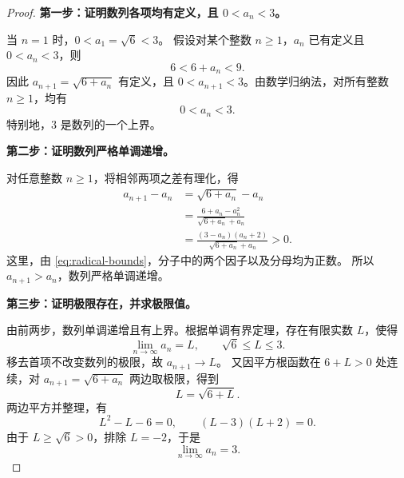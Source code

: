 \documentclass[UTF8,12pt,a4paper,fontset=fandol]{ctexart}
\begin{document}
\begin{proof}
\textbf{第一步：证明数列各项均有定义，且 $0<a_n<3$。}

当 $n=1$ 时，$0<a_1=\sqrt{6}<3$。
假设对某个整数 $n\ge1$，$a_n$ 已有定义且 $0<a_n<3$，则
\[
  6<6+a_n<9.
\]
因此 $a_{n+1}=\sqrt{6+a_n}$ 有定义，且
$0<a_{n+1}<3$。由数学归纳法，对所有整数 $n\ge1$，均有
\begin{equation}\label{eq:radical-bounds}
  0<a_n<3.
\end{equation}
特别地，$3$ 是数列的一个上界。

\textbf{第二步：证明数列严格单调递增。}

对任意整数 $n\ge1$，将相邻两项之差有理化，得
\begin{align*}
  a_{n+1}-a_n
  &=\sqrt{6+a_n}-a_n\\
  &=\frac{6+a_n-a_n^2}{\sqrt{6+a_n}+a_n}\\
  &=\frac{(3-a_n)(a_n+2)}{\sqrt{6+a_n}+a_n}>0.
\end{align*}
这里，由 \eqref{eq:radical-bounds}，分子中的两个因子以及分母均为正数。
所以 $a_{n+1}>a_n$，数列严格单调递增。

\textbf{第三步：证明极限存在，并求极限值。}

由前两步，数列单调递增且有上界。根据单调有界定理，存在有限实数 $L$，使得
\[
  \lim_{n\to\infty}a_n=L,\qquad \sqrt{6}\le L\le3.
\]
移去首项不改变数列的极限，故 $a_{n+1}\to L$。
又因平方根函数在 $6+L>0$ 处连续，对
$a_{n+1}=\sqrt{6+a_n}$ 两边取极限，得到
\[
  L=\sqrt{6+L}.
\]
两边平方并整理，有
\[
  L^2-L-6=0,\qquad (L-3)(L+2)=0.
\]
由于 $L\ge\sqrt{6}>0$，排除 $L=-2$，于是
\begin{equation}\label{eq:radical-limit}
  \boxed{\displaystyle\lim_{n\to\infty}a_n=3}.
\end{equation}
\end{proof}
\end{document}
